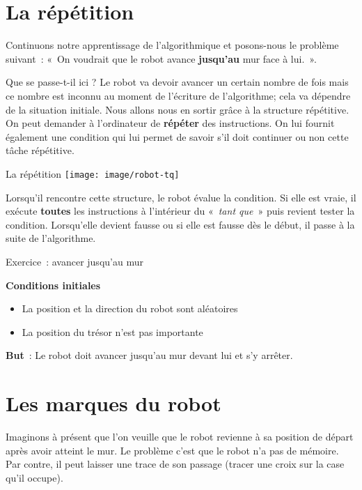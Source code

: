 \section{La répétition}

	Continuons notre apprentissage de l'algorithmique et
	posons-nous le problème suivant~: «~On voudrait que le robot avance
	\textbf{jusqu'au} mur face à lui.~».
	
	Que se passe-t-il ici ? Le robot va devoir avancer un certain nombre de
	fois mais ce nombre est inconnu au moment de
	l'écriture de l'algorithme; cela va
	dépendre de la situation initiale. Nous allons nous en sortir grâce à
	la structure répétitive. On peut demander à
	l'ordinateur de \textbf{répéter} des instructions. On
	lui fournit également une condition qui lui permet de savoir
	s'il doit continuer ou non cette tâche répétitive.

	
	\begin{Emphase}[definition]{La répétition}
	\texttt{[image: image/robot-tq]}
	\end{Emphase}

	Lorsqu'il rencontre cette structure, le robot évalue la
	condition. Si elle est vraie, il exécute \textbf{toutes} les
	instructions à l'intérieur du «~\textit{tant que~}»
	puis revient tester la condition. Lorsqu'elle devient
	fausse ou si elle est fausse dès le début, il passe à la suite de
	l'algorithme.
	
	\begin{Emphase}[exercice]{Exercice~: avancer jusqu'au mur}

		\textbf{Conditions initiales}

		\begin{itemize}
		\item La position et la direction du robot sont aléatoires
		\item La position du trésor n'est pas importante
		\end{itemize}
		
		\textbf{But}~: Le robot doit avancer jusqu'au mur
		devant lui et s'y arrêter.

	\end{Emphase}

\section{Les marques du robot}

	Imaginons à présent que l'on veuille que le robot
	revienne à sa position de départ après avoir atteint le mur. Le
	problème c'est que le robot n'a pas
	de mémoire. Par contre, il peut laisser une trace de son passage
	(tracer une croix sur la case qu'il occupe).
	
